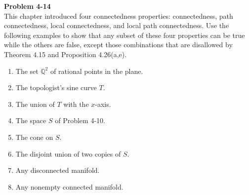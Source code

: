 \documentclass[12pt, a4paper]{article}
\theoremstyle{plain}
\newcommand{\Q}{\mathbb{Q}}
\newenvironment{problem}[2][Problem]
    { \begin{mdframed}[backgroundcolor=gray!20] \textbf{#1 #2} \\}
    {  \end{mdframed}}
\begin{document}
\begin{problem}{4-14}
This chapter introduced four connectedness properties: connectedness, path connectedness, local connectedness, and local path connectedness. Use the following examples to show that any subset of these four properties can be true while the others are false, except those combinations that are disallowed by Theorem 4.15 and Proposition 4.26(a,e).
\begin{enumerate}[label=(\alph*)]
\item The set $\Q^2$ of rational points in the plane.
\item The topologist's sine curve $T$.
\item The union of $T$ with the $x$-axis.
\item The space $S$ of Problem 4-10.
\item The cone on $S$.
\item The disjoint union of two copies of $S$.
\item Any disconnected manifold.
\item Any nonempty connected manifold.
\end{enumerate}
\end{problem}
\end{document}
